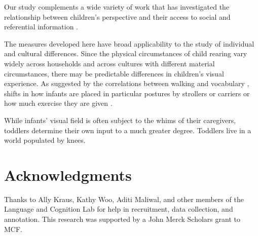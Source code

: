 \documentclass[10pt,letterpaper]{article}
\begin{document}
Our study complements a wide variety of work that has investigated the relationship between children's perspective and their access to social and referential information \cite{yoshida2008,franchak2011,smith2011,yuinpress,walleunderreview}. 

The measures developed here have broad applicability to the study of individual and cultural differences. Since the physical circumstances of child rearing vary widely across households and across cultures with different material circumstances, there may be predictable differences in children's visual experience. As suggested by the correlations between walking and vocabulary \cite{walleunderreview}, shifts in how infants are placed in particular postures by strollers or carriers \cite{zeedyk2008} or how much exercise they are given \cite{bril1986}.

While infants' visual field is often subject to the whims of their caregivers, toddlers determine their own input to a much greater degree. Toddlers live in a world populated by knees. 


\section{Acknowledgments}

Thanks to Ally Kraus, Kathy Woo, Aditi Maliwal, and other members of the Language and Cognition Lab for help in recruitment, data collection, and annotation. This research was supported by a John Merck Scholars grant to MCF.



\setlength{\bibleftmargin}{.125in} \setlength{\bibindent}{-\bibleftmargin}


\end{document}
